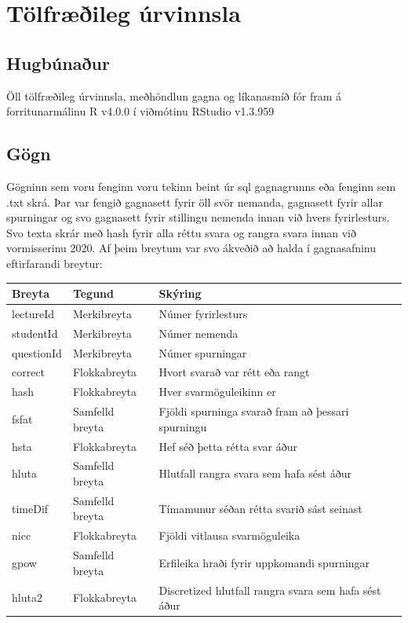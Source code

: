 \documentclass[
  12pt,
]{article}
\begin{document}
\hypertarget{tuxf6lfruxe6uxf0ileg-uxfarvinnsla}{%
\section{Tölfræðileg úrvinnsla}\label{tuxf6lfruxe6uxf0ileg-uxfarvinnsla}}

\hypertarget{hugbuxfanauxf0ur}{%
\subsection{Hugbúnaður}\label{hugbuxfanauxf0ur}}

Öll tölfræðileg úrvinnsla, meðhöndlun gagna og líkanasmíð fór fram á forritunarmálinu
R v4.0.0 í viðmótinu RStudio v1.3.959

\hypertarget{guxf6gn}{%
\subsection{Gögn}\label{guxf6gn}}

Gögninn sem voru fenginn voru tekinn beint úr sql gagnagrunns eða fenginn sem .txt skrá. Þar var fengið gagnasett fyrir öll svör nemanda, gagnasett fyrir allar spurningar og svo gagnasett fyrir stillingu nemenda innan við hvers fyrirlesturs. Svo texta skrár með hash fyrir alla réttu svara og rangra svara innan við vormisserinu 2020. Af þeim breytum var svo ákveðið að halda í gagnasafninu eftirfarandi breytur:

\begin{longtable}[]{@{}lll@{}}
\toprule
Breyta & Tegund & Skýring\tabularnewline
\midrule
\endhead
lectureId & Merkibreyta & Númer fyrirlesturs\tabularnewline
studentId & Merkibreyta & Númer nemenda\tabularnewline
questionId & Merkibreyta & Númer spurningar\tabularnewline
correct & Flokkabreyta & Hvort svarað var rétt eða rangt\tabularnewline
hash & Flokkabreyta & Hver svarmöguleikinn er\tabularnewline
fsfat & Samfelld breyta & Fjöldi spurninga svarað fram að þessari spurningu\tabularnewline
hsta & Flokkabreyta & Hef séð þetta rétta svar áður\tabularnewline
hluta & Samfelld breyta & Hlutfall rangra svara sem hafa sést áður\tabularnewline
timeDif & Samfelld breyta & Tímamunur séðan rétta svarið sást seinast\tabularnewline
nicc & Flokkabreyta & Fjöldi vitlausa svarmöguleika\tabularnewline
gpow & Samfelld breyta & Erfileika hraði fyrir uppkomandi spurningar\tabularnewline
hluta2 & Flokkabreyta & Discretized hlutfall rangra svara sem hafa sést áður\tabularnewline
\bottomrule
\end{longtable}
\end{document}
